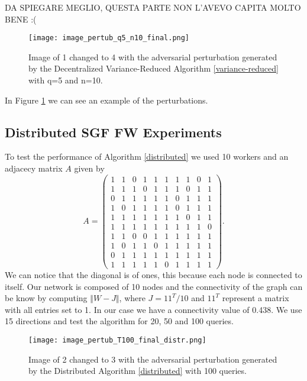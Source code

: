 DA SPIEGARE MEGLIO, QUESTA PARTE NON L'AVEVO CAPITA MOLTO BENE :(

\begin{figure}[htbp]
	\centering
	\texttt{[image: image\_pertub\_q5\_n10\_final.png]}
	\caption{Image of 1 changed to 4 with the adversarial perturbation generated by the Decentralized Variance-Reduced Algorithm \ref{variance-reduced} with q=5 and n=10.}
	\label{fig:variance-reduced}
\end{figure}
In Figure \ref{fig:variance-reduced} we can see an example of the perturbations.


\subsection{Distributed SGF FW Experiments}
To test the performance of Algorithm \ref{distributed} we used 10 workers and an adjacecy matrix $A$ given by 
\[ A = 
\begin{pmatrix}
1& 1& 0& 1& 1& 1& 1& 1& 0& 1\\
1& 1& 1& 0& 1& 1& 1& 0& 1& 1\\
0& 1& 1& 1& 1& 1& 0& 1& 1& 1\\
1& 0& 1& 1& 1& 1& 0& 1& 1& 1\\
1& 1& 1& 1& 1& 1& 1& 0& 1& 1\\
1& 1& 1& 1& 1& 1& 1& 1& 1& 0\\
1& 1& 0& 0& 1& 1& 1& 1& 1& 1\\
1& 0& 1& 1& 0& 1& 1& 1& 1& 1\\
0& 1& 1& 1& 1& 1& 1& 1& 1& 1\\
1& 1& 1& 1& 1& 0& 1& 1& 1& 1	
\end{pmatrix}
.\]
We can notice that the diagonal is of ones, this because each node is connected to itself. Our network is composed of 10 nodes and the connectivity of the graph can be know by computing $\Vert W- J \Vert$, where $J= 11^T/10$ and $11^T$ represent a matrix with all entries set to 1. In our case we have a connectivity value of 0.438. We use 15 directions and test the algorithm for 20, 50 and 100 queries.

\begin{figure}[htbp]
	\centering
	\texttt{[image: image\_pertub\_T100\_final\_distr.png]}
	\caption{Image of 2 changed to 3 with the adversarial perturbation generated by the Distributed Algorithm \ref{distributed} with 100 queries.}
	\label{fig:distributed}
\end{figure}
